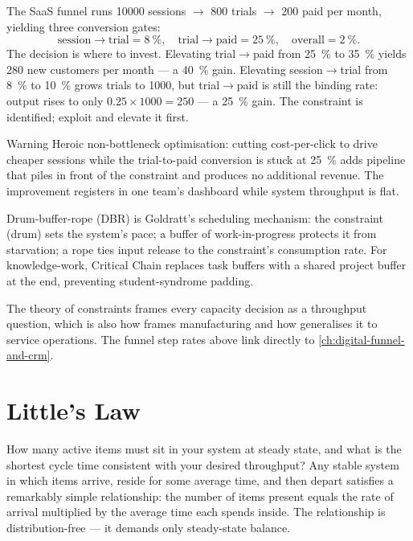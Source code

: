 \begin{example}
The SaaS funnel runs \num{10000} sessions \(\to\) \num{800} trials \(\to\) \num{200} paid per month, yielding three conversion gates:
\[
  \text{session}\to\text{trial}=\qty{8}{\percent},\quad
  \text{trial}\to\text{paid}=\qty{25}{\percent},\quad
  \text{overall}=\qty{2}{\percent}.
\]
The decision is where to invest. Elevating trial\(\to\)paid from \qty{25}{\percent} to \qty{35}{\percent} yields \num{280} new customers per month --- a \qty{40}{\percent} gain. Elevating session\(\to\)trial from \qty{8}{\percent} to \qty{10}{\percent} grows trials to \num{1000}, but trial\(\to\)paid is still the binding rate: output rises to only \(0.25\times1000=250\) --- a \qty{25}{\percent} gain. The constraint is identified; exploit and elevate it first.
\end{example}

\begin{admonition}{Warning}
Heroic non-bottleneck optimisation: cutting cost-per-click to drive cheaper sessions while the trial-to-paid conversion is stuck at \qty{25}{\percent} adds pipeline that piles in front of the constraint and produces no additional revenue. The improvement registers in one team's dashboard while system throughput is flat.
\end{admonition}

Drum-buffer-rope (DBR) is Goldratt's scheduling mechanism: the constraint (drum) sets the system's pace; a buffer of work-in-progress protects it from starvation; a rope ties input release to the constraint's consumption rate. For knowledge-work, Critical Chain replaces task buffers with a shared project buffer at the end, preventing student-syndrome padding.

The theory of constraints frames every capacity decision as a throughput question, which is also how \textcite{goldratt2014} frames manufacturing and how \textcite{cachon2024matching} generalises it to service operations. The funnel step rates above link directly to \cref{ch:digital-funnel-and-crm}.

\section{Little's Law}\label{sec:littles-law}

How many active items must sit in your system at steady state, and what is the shortest cycle time consistent with your desired throughput? Any stable system in which items arrive, reside for some average time, and then depart satisfies a remarkably simple relationship: the number of items present equals the rate of arrival multiplied by the average time each spends inside. The relationship is distribution-free --- it demands only steady-state balance.

